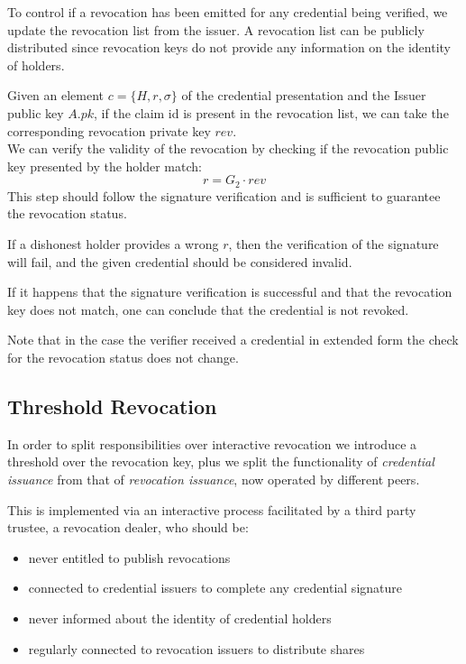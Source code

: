 To control if a revocation has been emitted for any credential being
verified, we update the revocation list from the issuer. A revocation
list can be publicly distributed since revocation keys do not provide
any information on the identity of holders.

Given an element $c = \{H, r, \sigma \}$ of the credential
presentation and the Issuer public key $A.pk$, if the claim id is
present in the revocation list, we can take the corresponding
revocation private key $rev$.\\ We can verify the validity of the
revocation by checking if the revocation public key presented by the
holder match:
\begin{equation*}
    r = G_2 \cdot rev
\end{equation*}
This step should follow the signature verification and is sufficient
to guarantee the revocation status.

If a dishonest holder provides a wrong $r$, then the verification of
the signature will fail, and the given credential should be considered
invalid.

If it happens that the signature verification is successful and that
the revocation key does not match, one can conclude that the
credential is not revoked.

Note that in the case the verifier received a credential in extended form the check for the revocation status does not change.

\subsection{Threshold Revocation}

In order to split responsibilities over interactive revocation we
introduce a threshold over the revocation key, plus we split the
functionality of \textit{credential issuance} from that of
\textit{revocation issuance}, now operated by different peers.

This is implemented via an interactive process facilitated by a third
party trustee, a revocation dealer, who should be:
\begin{itemize}
    \item never entitled to publish revocations
    \item connected to credential issuers to complete any credential
      signature
    \item never informed about the identity of credential holders
    \item regularly connected to revocation issuers to distribute
      shares
\end{itemize}

